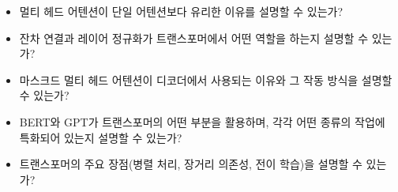 \documentclass[11pt,a4paper]{article}
\begin{document}
\begin{summarybox}[title={학습 점검 체크리스트}]
\begin{itemize}
\begin{itemize}
        \item 멀티 헤드 어텐션이 단일 어텐션보다 유리한 이유를 설명할 수 있는가?
        \item 잔차 연결과 레이어 정규화가 트랜스포머에서 어떤 역할을 하는지 설명할 수 있는가?
        \item 마스크드 멀티 헤드 어텐션이 디코더에서 사용되는 이유와 그 작동 방식을 설명할 수 있는가?
        \item BERT와 GPT가 트랜스포머의 어떤 부분을 활용하며, 각각 어떤 종류의 작업에 특화되어 있는지 설명할 수 있는가?
        \item 트랜스포머의 주요 장점(병렬 처리, 장거리 의존성, 전이 학습)을 설명할 수 있는가?
\end{itemize}
\end{itemize}
\end{summarybox}
\end{document}
